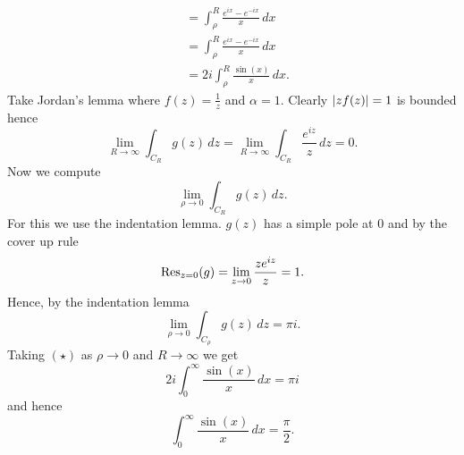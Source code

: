 \begin{solution}
\begin{align*}
        &= \int_{\rho}^{R} \frac{e^{ix} - e^{-ix}}{x} \,dx \\
        &= \int_{\rho}^R \frac{e^{ix} - e^{-ix}}{x} \,dx \\
        &= 2i \int_{\rho}^{R} \frac{\sin(x)}{x} \,dx.
    \end{align*}
    Take Jordan's lemma where $f(z) = \frac1z$ and $\alpha = 1$. Clearly
    $\left\lvert zf(z)\right\rvert = 1$ is bounded hence
    \[
        \lim_{R \to \infty} \int_{C_R} g(z) \,dz = \lim_{R \to \infty} \int_{C_R} \frac{e^{iz}}{z} \,dz = 0.
    \]
    Now we compute
    \[
        \lim_{\rho \to 0} \int_{C_R} g(z) \,dz.
    \]
    For this we use the indentation lemma.
    $g(z)$ has a simple pole at $0$ and by the cover up rule 
    \[
        \operatorname{Res}_{z = 0} (g) = \lim_{z \to 0} \frac{ze^{iz}}{z} = 1.
    \]
    Hence, by the indentation lemma
    \[
        \lim_{\rho \to 0} \int_{C_\rho} g(z) \,dz = \pi i.
    \]
    Taking $(\star)$ as $\rho \to 0$ and $R \to \infty$ we get
    \[
        2i \int_0^\infty \frac{\sin(x)}{x} \,dx = \pi i
    \]
    and hence
    \[
        \int_0^\infty \frac{\sin(x)}{x} \,dx = \frac{\pi}{2}.
    \]
\end{solution}

